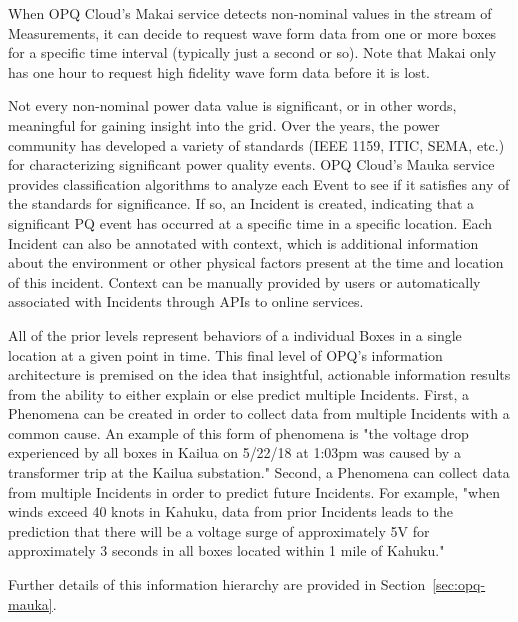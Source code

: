 When OPQ Cloud's Makai service detects non-nominal values in the stream of Measurements, it can decide to request wave form data from one or more boxes for a specific time interval (typically just a second or so). Note that Makai only has one hour to request high fidelity wave form data before it is lost.

Not every non-nominal power data value is significant, or in other words, meaningful for gaining insight into the grid. Over the years, the power community has developed a variety of standards (IEEE 1159, ITIC, SEMA, etc.) for characterizing significant power quality events. OPQ Cloud's Mauka service provides classification algorithms to analyze each Event to see if it satisfies any of the standards for significance. If so, an Incident is created, indicating that a significant PQ event has occurred at a specific time in a specific location. Each Incident can also be annotated with context, which is additional information about the environment or other physical factors present at the time and location of this incident. Context can be manually provided by users or automatically associated with Incidents through APIs to online services.

All of the prior levels represent behaviors of a individual Boxes in a single location at a given point in time. This final level of OPQ's information architecture is premised on the idea that insightful, actionable information results from the ability to either explain or else predict multiple Incidents. First, a Phenomena can be created in order to collect data from multiple Incidents with a common cause. An example of this form of phenomena is "the voltage drop experienced by all boxes in Kailua on 5/22/18 at 1:03pm was caused by a transformer trip at the Kailua substation." Second, a Phenomena can collect data from multiple Incidents in order to predict future Incidents. For example, "when winds exceed 40 knots in Kahuku, data from prior Incidents leads to the prediction that there will be a voltage surge of approximately 5V for approximately 3 seconds in all boxes located within 1 mile of Kahuku."

Further details of this information hierarchy are provided in Section~\ref{sec:opq-mauka}.


